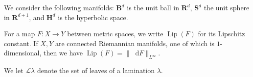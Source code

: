 \documentclass[final,12pt, leqno]{brownthesis}
\newcommand{\RR}{\mathbf{R}}
\newcommand{\Hyp}{\mathbf H}
\newcommand{\Sph}{\mathbf S}
\newcommand{\Ball}{\mathbf{B}}
\DeclareMathOperator{\Lip}{Lip}
\newcommand*\dif{\mathop{}\!\mathrm{d}}
\DeclareMathOperator{\dist}{dist}
\newcommand{\Leaves}{\mathcal L}
\newcommand{\Hypspace}{\mathscr H}
\newcommand{\dfn}[1]{\emph{#1}\index{#1}}
\theoremstyle{definition}
\newtheorem{definition}[theorem]{Definition}
\numberwithin{equation}{section}
\begin{document}
We consider the following manifolds: $\Ball^d$ is the unit ball in $\RR^d$, $\Sph^d$ the unit sphere in $\RR^{d + 1}$, and $\Hyp^d$ is the hyperbolic space.

For a map $F: X \to Y$ between metric spaces, we write $\Lip(F)$ for its Lipschitz constant.
If $X, Y$ are connected Riemannian manifolds, one of which is $1$-dimensional, then we have $\Lip(F) = \|\dif F\|_{L^\infty}$.

We let $\Leaves \lambda$ denote the set of leaves of a lamination $\lambda$.



\end{document}

